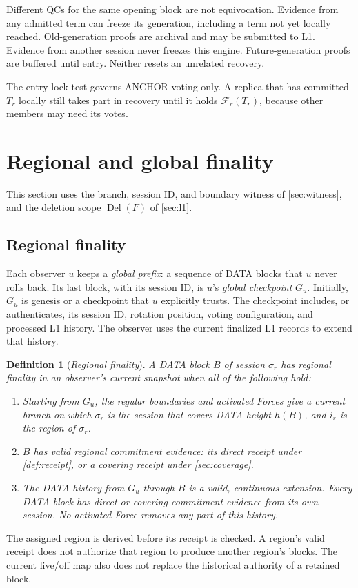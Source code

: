 \documentclass[11pt,a4paper]{article}
\newcommand{\RR}[1]{{\color{rrRed}#1}}
\newcommand{\FC}{\mathcal F}
\newcommand{\Del}{\operatorname{Del}}
\newcommand{\defterm}[1]{\textcolor{rrBlue}{\textit{#1}}}
\newtheorem{definition}{Definition}[section]
\begin{document}
Different QCs for the same opening block are not equivocation. Evidence
from any admitted term can freeze its generation, including a term not
yet locally reached. Old-generation proofs are archival and may be
submitted to L1. \RR{Evidence from another session never freezes this
engine.} Future-generation proofs are buffered until entry. Neither
resets an unrelated recovery.

The entry-lock test governs ANCHOR voting only. A replica that has
committed $T_r$ locally still takes part in recovery until it holds
$\FC_r(T_r)$, because other members may need its votes.

\section{Regional and global finality}
\label{sec:external}
This section uses the branch, session ID, and boundary
witness of \cref{sec:witness}, and the deletion scope $\Del(F)$ of
\cref{sec:l1}.

\subsection{Regional finality}
\label{sec:regional-finality}
Each observer $u$ keeps a \defterm{global prefix}: a sequence
of DATA blocks that $u$ never rolls back. Its last block, with its
session ID, is $u$'s \defterm{global checkpoint} $G_u$. Initially, $G_u$ is
genesis or a checkpoint that $u$ explicitly trusts.
The checkpoint includes, or authenticates, its session ID, rotation
position, voting configuration, and processed L1 history. The observer
uses the current finalized L1 records to extend that history.

\begin{definition}[\defterm{Regional finality}]
\label{def:regional-finality}
A DATA block $B$ of session $\sigma_r$ has regional finality in an observer's current snapshot
when all of the following hold:
\begin{enumerate}[label=(\roman*)]
\item Starting from $G_u$, the regular boundaries and
activated Forces give a current branch on which $\sigma_r$ is the
session that covers DATA height $h(B)$, and $i_r$ is the region of
$\sigma_r$.
\item $B$ has valid regional commitment evidence: its direct receipt
under \cref{def:receipt}, or a covering receipt under \cref{sec:coverage}.
\item The DATA history from $G_u$ through $B$ is a valid, continuous
extension. Every DATA block has direct or covering commitment evidence
from its own session. No
activated Force removes any part of this history.
\end{enumerate}
\end{definition}
The assigned region is derived before its receipt is checked. A region's
valid receipt does not authorize that region to produce another region's
blocks. The current live/off map also does not replace the historical
authority of a retained block.
\end{document}
